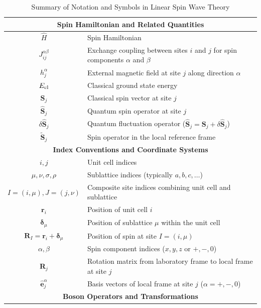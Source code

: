 \documentclass[aps, prx, nofootinbib, preprintnumbers, superscriptaddress]{revtex4-2}
\begin{document}
\begin{table}[!h]
    \centering
    \caption{Summary of Notation and Symbols in Linear Spin Wave Theory}
    \begin{tabular}{c|p{14cm}}
    \hline\hline
    \multicolumn{2}{c}{\bf Spin Hamiltonian and Related Quantities} \\
    \hline
    $\hat{H}$ & Spin Hamiltonian \\
    $J_{ij}^{\alpha\beta}$ & Exchange coupling between sites $i$ and $j$ for spin components $\alpha$ and $\beta$ \\
    $h_j^{\alpha}$ & External magnetic field at site $j$ along direction $\alpha$ \\
    $E_{\rm cl}$ & Classical ground state energy \\
    $\mathbf{S}_j$ & Classical spin vector at site $j$ \\
    $\hat{\mathbf{S}}_j$ & Quantum spin operator at site $j$ \\
    $\delta\hat{\mathbf{S}}_j$ & Quantum fluctuation operator ($\hat{\mathbf{S}}_j = \mathbf{S}_j + \delta\hat{\mathbf{S}}_j$) \\
    $\widetilde{\mathbf{S}}_j$ & Spin operator in the local reference frame \\
    \hline
    \multicolumn{2}{c}{\bf Index Conventions and Coordinate Systems} \\
    \hline
    $i, j$ & Unit cell indices \\
    $\mu, \nu, \sigma, \rho$ & Sublattice indices (typically $a, b, c, \ldots$) \\
    $I = (i, \mu), J = (j, \nu)$ & Composite site indices combining unit cell and sublattice \\
    $\mathbf{r}_i$ & Position of unit cell $i$ \\
    $\boldsymbol{\delta}_\mu$ & Position of sublattice $\mu$ within the unit cell \\
    $\mathbf{R}_I = \mathbf{r}_i + \boldsymbol{\delta}_\mu$ & Position of spin at site $I = (i, \mu)$ \\
    $\alpha, \beta$ & Spin component indices ($x, y, z$ or $+, -, 0$) \\
    $\mathbf{R}_j$ & Rotation matrix from laboratory frame to local frame at site $j$ \\
    $\hat{\mathbf{e}}_j^{\alpha}$ & Basis vectors of local frame at site $j$ ($\alpha = +, -, 0$) \\
    \hline
    \multicolumn{2}{c}{\bf Boson Operators and Transformations} \\

\end{tabular}
\end{table}
\end{document}

